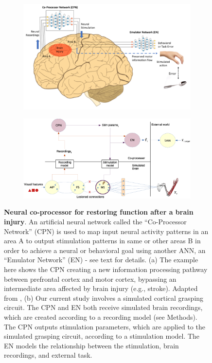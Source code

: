 \documentclass[12pt]{iopart}
\begin{document}
\begin{figure}
    \centering
    \begin{subfigure}[c]{0.75\textwidth}
		\centering
		\includegraphics[width=\textwidth]{weill_arch.png}
		\caption{}
	\end{subfigure}
	\hfill
    \begin{subfigure}[c]{0.75\textwidth}
		\centering
		\includegraphics[width=\textwidth]{cpn_michaels_arch_labeled.eps}
		\caption{}
	\end{subfigure}
	\hfill
    \caption{{\bf Neural co-processor for restoring function after a brain injury}.
    An artificial neural network called the “Co-Processor Network” (CPN) is used to
    map input neural activity patterns in an area A to output stimulation patterns
    in same or other areas B in order to achieve a neural or behavioral goal using
    another ANN, an “Emulator Network” (EN) - see text for details. (a) The example
    here shows the CPN creating a new information processing pathway between prefrontal
    cortex and motor cortex, bypassing an intermediate area affected by brain injury
    (e.g., stroke). Adapted from \cite{rao.coproc}, (b) Our current study involves a
    simulated cortical grasping circuit. The CPN and EN both receive simulated brain
    recordings, which are created according to a recording model (see Methods).
    The CPN outputs stimulation parameters, which are applied to the simulated
    grasping circuit, according to a stimulation model. The EN models the relationship between the
    stimulation, brain recordings, and external task.}
    \label{fig:arch}
\end{figure}
\end{document}
